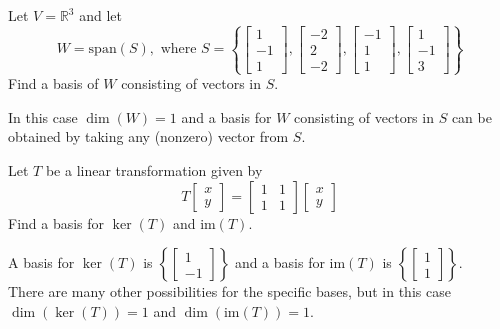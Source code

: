 \documentclass{ximera}
\begin{document}
\begin{problem}\label{prb:10.86}
Let $V=\mathbb{R}^{3}$ and let
\begin{equation*}
W=\mbox{span} \left( S \right),  \mbox{ where } S=\left\{ \left[
\begin{array}{r}
1 \\
-1 \\
1
\end{array}
\right] ,\left[
\begin{array}{r}
-2 \\
2 \\
-2
\end{array}
\right],\left[
\begin{array}{r}
-1 \\
1 \\
1
\end{array}
\right],\left[
\begin{array}{r}
1 \\
-1 \\
3
\end{array}
\right] \right\}
\end{equation*}
Find a basis of $W$ consisting of vectors in $S$.

\begin{hint}
In this case $\dim (W)=1$ and a basis for $W$ consisting of vectors in $S$ can be obtained by taking any (nonzero) vector from $S$.
\end{hint}
\end{problem}


\begin{problem}\label{prb:10.87}
 Let $T$ be a linear transformation given by
\[
T \left[ \begin{array}{r}
x\\
y
\end{array}\right] = \left[ \begin{array}{rrr}
1 &1  \\
1 & 1
\end{array}\right]
\left[ \begin{array}{r}
x\\
y
\end{array}\right]
\]
Find a basis for $\ker \left( T\right)$ and $\mbox{im} \left( T\right) $.

\begin{hint}
A basis for $\ker \left( T\right)$ is
$\left\{ \left[
\begin{array}{r}
1 \\
-1
\end{array}
\right] \right\}$
and a basis for $\mbox{im} \left( T\right)$ is
$\left\{ \left[
\begin{array}{r}
1 \\
1
\end{array}
\right] \right\}$. \\
There are many other possibilities for the specific bases, but in this case
$\dim \left( \ker \left( T\right) \right)=1 $ and $\dim \left( \mbox{im} \left( T\right) \right)=1$.
\end{hint}

\end{problem}
\end{document}
